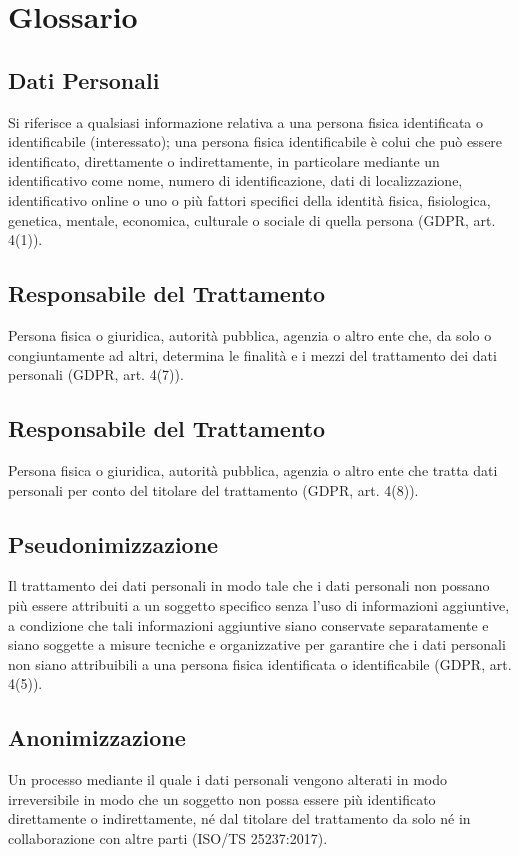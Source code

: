 \chapter*{Glossario}

\section*{Dati Personali}
Si riferisce a qualsiasi informazione relativa a una persona fisica identificata o identificabile (interessato); una persona fisica identificabile è colui che può essere identificato, direttamente o indirettamente, in particolare mediante un identificativo come nome, numero di identificazione, dati di localizzazione, identificativo online o uno o più fattori specifici della identità fisica, fisiologica, genetica, mentale, economica, culturale o sociale di quella persona (GDPR, art. 4(1)).

\section*{Responsabile del Trattamento}
Persona fisica o giuridica, autorità pubblica, agenzia o altro ente che, da solo o congiuntamente ad altri, determina le finalità e i mezzi del trattamento dei dati personali (GDPR, art. 4(7)).

\section*{Responsabile del Trattamento}
Persona fisica o giuridica, autorità pubblica, agenzia o altro ente che tratta dati personali per conto del titolare del trattamento (GDPR, art. 4(8)).

\section*{Pseudonimizzazione}
Il trattamento dei dati personali in modo tale che i dati personali non possano più essere attribuiti a un soggetto specifico senza l'uso di informazioni aggiuntive, a condizione che tali informazioni aggiuntive siano conservate separatamente e siano soggette a misure tecniche e organizzative per garantire che i dati personali non siano attribuibili a una persona fisica identificata o identificabile (GDPR, art. 4(5)).

\section*{Anonimizzazione}
Un processo mediante il quale i dati personali vengono alterati in modo irreversibile in modo che un soggetto non possa essere più identificato direttamente o indirettamente, né dal titolare del trattamento da solo né in collaborazione con altre parti (ISO/TS 25237:2017).

